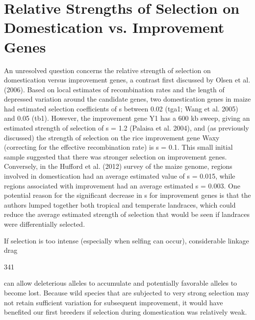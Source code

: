 \documentclass{article}
\begin{document}
\section{Relative Strengths of Selection on Domestication vs. Improvement Genes}
An unresolved question concerns the relative strength of selection on domestication versus improvement genes, a contrast first discussed by Olsen et al. (2006). Based on local estimates of recombination rates and the length of depressed variation around the candidate genes, two domestication genes in maize had estimated selection coefficients of s between 0.02 (tga1; Wang et al. 2005) and 0.05 (tb1). However, the improvement gene Y1 has a 600 kb sweep, giving an estimated strength of selection of s = 1.2 (Palaisa et al. 2004), and (as previously discussed) the strength of selection on the rice improvement gene Waxy (correcting for the effective recombination rate) is s = 0.1. This small initial sample suggested that there was stronger selection on improvement genes. Conversely, in the Hufford et al. (2012) survey of the maize genome, regions involved in domestication had an average estimated value of s = 0.015, while regions associated with improvement had an average estimated s = 0.003. One potential reason for the significant decrease in s for improvement genes is that the authors lumped together both tropical and temperate landraces, which could reduce the average estimated strength of selection that would be seen if landraces were differentially selected.

If selection is too intense (especially when selfing can occur), considerable linkage drag

341

can allow deleterious alleles to accumulate and potentially favorable alleles to become lost. Because wild species that are subjected to very strong selection may not retain sufficient variation for subsequent improvement, it would have benefited our first breeders if selection during domestication was relatively weak.
\end{document}
